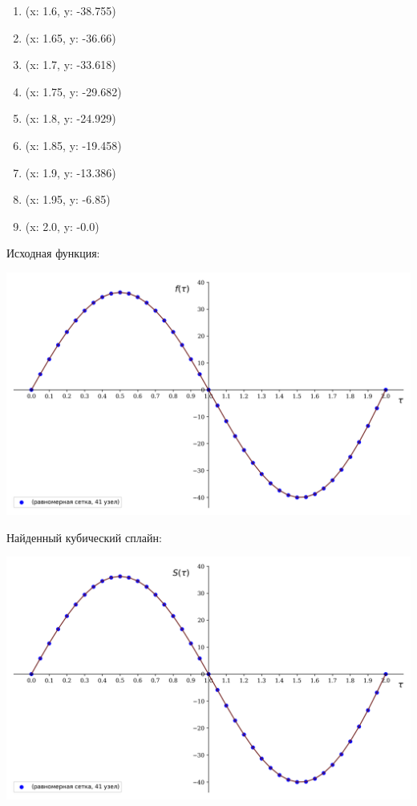 \documentclass[a4paper, 14pt]{extarticle}
\begin{document}
\begin{multicols}{3}
\begin{enumerate}[itemsep=5pt]
        \item (x: 1.6, y: -38.755)
        \item (x: 1.65, y: -36.66)
        \item (x: 1.7, y: -33.618)
        \item (x: 1.75, y: -29.682)
        \item (x: 1.8, y: -24.929)
        \item (x: 1.85, y: -19.458)
        \item (x: 1.9, y: -13.386)
        \item (x: 1.95, y: -6.85)
        \item (x: 2.0, y: -0.0)
    \end{enumerate} 
\end{multicols}

\vfill

Исходная функция:

\begin{center}
    \includegraphics[width=1\textwidth]{main_func_40}
\end{center}

\vfill

\newpage

\vfill

Найденный кубический сплайн: 

\begin{center}
    \includegraphics[width=1\textwidth]{spline_40}
\end{center}
\end{document}
